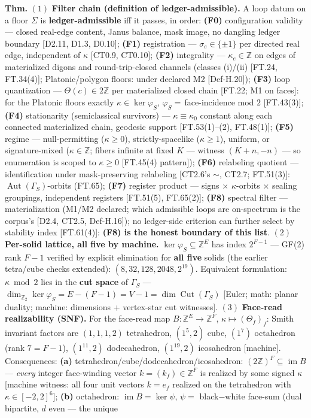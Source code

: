 \begin{theorem}\label{tag:FT-64}
\textbf{Thm.} $(1)$ \textbf{Filter chain (definition of ledger-admissible).} A loop datum on a floor $\Sigma$ is \textbf{ledger-admissible} iff it passes, in order: \textbf{(F0)} configuration validity — closed real-edge content, Janus balance, mask image, no dangling ledger boundary [D2.11, D1.3, D0.10]; \textbf{(F1)} registration — $\sigma_e\in\{\pm1\}$ per directed real edge, independent of $\kappa$ [CT0.9, CT0.10]; \textbf{(F2)} integrality — $\kappa_e\in\mathbb Z$ on edges of materialized digons and round-trip-closed channels (classes (i)/(ii) [FT.24, FT.34(4)]; Platonic/polygon floors: under declared M2 [Def-H.20]); \textbf{(F3)} loop quantization — $\Theta(c)\in2\mathbb Z$ per materialized closed chain [FT.22; M1 on faces]: for the Platonic floors exactly $\kappa\in\ker\varphi_S$, $\varphi_S=\,$face-incidence mod $2$ [FT.43(3)]; \textbf{(F4)} stationarity (semiclassical survivors) — $\kappa\equiv\kappa_0$ constant along each connected materialized chain, geodesic support [FT.53(1)–(2), FT.48(1)]; \textbf{(F5)} regime — null-permitting ($\kappa\ge0$), strictly-spacelike ($\kappa\ge1$), uniform, or signature-mixed ($\kappa\in\mathbb Z$; fibers infinite at fixed $K$ — witness $(K{+}n,-n)$ — so enumeration is scoped to $\kappa\ge0$ [FT.45(4) pattern]); \textbf{(F6)} relabeling quotient — identification under mask-preserving relabeling [CT2.6's $\sim$, CT2.7; FT.51(3)]: $\operatorname{Aut}(\Gamma_S)$-orbits (FT.65); \textbf{(F7)} register product — signs $\times$ $\kappa$-orbits $\times$ sealing groupings, independent registers [FT.51(5), FT.65(2)]; \textbf{(F8)} spectral filter — materialization (M1/M2 declared; which admissible loops are on-spectrum is the corpus's [D2.4, CT2.5, Def-H.16]); no ledger-side criterion can further select by stability index [FT.61(4)]: \textbf{(F8) is the honest boundary of this list}. $(2)$ \textbf{Per-solid lattice, all five by machine.} $\ker\varphi_S\subseteq\mathbb Z^E$ has index $2^{F-1}$ — GF(2) rank $F-1$ verified by explicit elimination for \textbf{all five} solids (the earlier tetra/cube checks extended): $(8,32,128,2048,2^{19})$. Equivalent formulation: $\kappa\bmod2$ lies in the \textbf{cut space} of $\Gamma_S$ — $\dim_{\mathbb Z_2}\ker\varphi_S=E-(F-1)=V-1=\dim\operatorname{Cut}(\Gamma_S)$ [Euler; math: planar duality; machine: dimensions + vertex-star cut witnesses]. $(3)$ \textbf{Face-read realizability (SNF).} For the face-read map $B:\mathbb Z^E\to\mathbb Z^F$, $\kappa\mapsto(\Theta_f)_f$: Smith invariant factors are $(1,1,1,2)$ tetrahedron, $(1^5,2)$ cube, $(1^7)$ octahedron (rank $7=F{-}1$), $(1^{11},2)$ dodecahedron, $(1^{19},2)$ icosahedron [machine]. Consequences: \textbf{(a)} tetrahedron/cube/dodecahedron/icosahedron: $(2\mathbb Z)^F\subseteq\operatorname{im}B$ — \textit{every} integer face-winding vector $k=(k_f)\in\mathbb Z^F$ is realized by some signed $\kappa$ [machine witness: all four unit vectors $k=e_f$ realized on the tetrahedron with $\kappa\in[-2,2]^6$]; \textbf{(b)} octahedron: $\operatorname{im}B=\ker\psi$, $\psi=$ black$-$white face-sum (dual bipartite, $d$ even — the unique 
\end{theorem}
